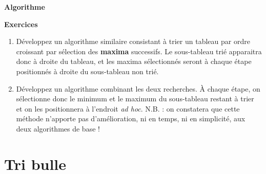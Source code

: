 	{\sffamily\bfseries\upshape
	Algorithme}
	

	\bigskip


	\bigskip

	{\sffamily\bfseries\upshape
	Exercices}

	\liststyleExercice
	\begin{enumerate}
		\item 
			Développez un algorithme similaire consistant à trier un tableau par
			ordre croissant par sélection des \textbf{maxima} successifs. Le
			sous-tableau trié apparaitra donc à droite du tableau, et les maxima
			sélectionnés seront à chaque étape positionnés à droite du sous-tableau
			non trié. 
		\item 
			Développez un algorithme combinant les deux recherches. À chaque étape,
			on sélectionne donc le minimum et le maximum du sous-tableau restant à
			trier et on les positionnera à l’endroit \textit{ad hoc}. N.B. : on
			constatera que cette méthode n’apporte pas d’amélioration, ni en temps,
			ni en simplicité, aux deux algorithmes de base !
	\end{enumerate}
	

\section{Tri bulle}
	
